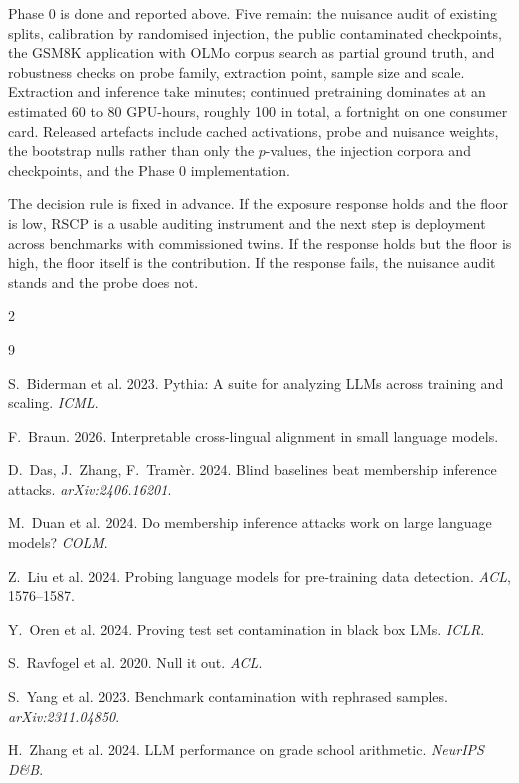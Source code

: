 \documentclass[10pt,letterpaper]{article}
\begin{document}
Phase 0 is done and reported above. Five remain: the nuisance audit of existing splits, calibration by randomised injection, the public contaminated checkpoints, the GSM8K application with OLMo corpus search as partial ground truth, and robustness checks on probe family, extraction point, sample size and scale. Extraction and inference take minutes; continued pretraining dominates at an estimated 60 to 80 GPU-hours, roughly 100 in total, a fortnight on one consumer card. Released artefacts include cached activations, probe and nuisance weights, the bootstrap nulls rather than only the $p$-values, the injection corpora and checkpoints, and the Phase 0 implementation.

The decision rule is fixed in advance. If the exposure response holds and the floor is low, RSCP is a usable auditing instrument and the next step is deployment across benchmarks with commissioned twins. If the response holds but the floor is high, the floor itself is the contribution. If the response fails, the nuisance audit stands and the probe does not.

\renewcommand{\refname}{\normalsize\bfseries References}
\begin{multicols}{2}
\begin{thebibliography}{9}
\scriptsize
\setlength{\leftmargin}{0pt}
\setlength{\itemsep}{0pt}
\setlength{\parsep}{0pt}
\setlength{\labelsep}{3pt}

 S.~Biderman et al. 2023. Pythia: A suite for analyzing LLMs across training and scaling. \emph{ICML}.

 F.~Braun. 2026. Interpretable cross-lingual alignment in small language models. %

 D.~Das, J.~Zhang, F.~Tram\`er. 2024. Blind baselines beat membership inference attacks. \emph{arXiv:2406.16201}.

 M.~Duan et al. 2024. Do membership inference attacks work on large language models? \emph{COLM}.

 Z.~Liu et al. 2024. Probing language models for pre-training data detection. \emph{ACL}, 1576--1587.

 Y.~Oren et al. 2024. Proving test set contamination in black box LMs. \emph{ICLR}.

 S.~Ravfogel et al. 2020. Null it out. \emph{ACL}.

 S.~Yang et al. 2023. Benchmark contamination with rephrased samples. \emph{arXiv:2311.04850}.

 H.~Zhang et al. 2024. LLM performance on grade school arithmetic. \emph{NeurIPS D\&B}.

\end{thebibliography}
\end{multicols}
\end{document}
